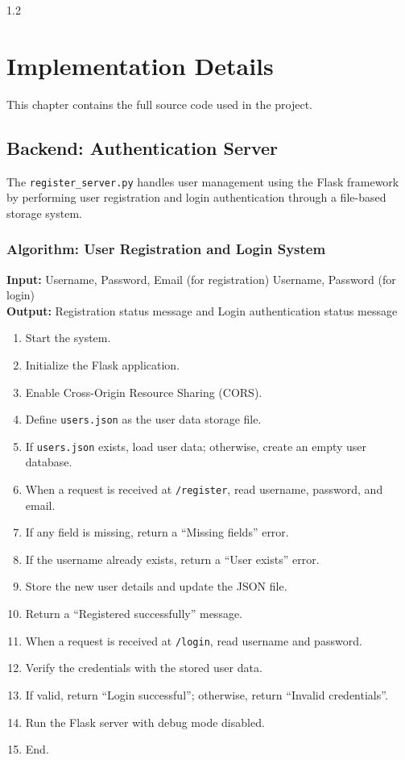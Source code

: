 \documentclass[12pt, a4paper]{report}
\begin{document}
\begin{spacing}{1.2}
\chapter{Implementation Details}
This chapter contains the full source code used in the project.

\section{Backend: Authentication Server}
The \texttt{register\_server.py} handles user management using the Flask framework by performing user registration and login authentication through a file-based storage system.

\subsection*{Algorithm: User Registration and Login System}

\textbf{Input:}  
Username, Password, Email (for registration)  
Username, Password (for login)
\vspace{-0.05cm}
\textbf{\\Output:}  
Registration status message and Login authentication status message

\begin{enumerate}
    \item Start the system.
    \item Initialize the Flask application.
    \item Enable Cross-Origin Resource Sharing (CORS).
    \item Define \texttt{users.json} as the user data storage file.
    \item If \texttt{users.json} exists, load user data; otherwise, create an empty user database.
    \item When a request is received at \texttt{/register}, read username, password, and email.
    \item If any field is missing, return a “Missing fields” error.
    \item If the username already exists, return a “User exists” error.
    \item Store the new user details and update the JSON file.
    \item Return a “Registered successfully” message.
    \item When a request is received at \texttt{/login}, read username and password.
    \item Verify the credentials with the stored user data.
    \item If valid, return “Login successful”; otherwise, return “Invalid credentials”.
    \item Run the Flask server with debug mode disabled.
    \item End.
\end{enumerate}


\end{spacing}
\end{document}

